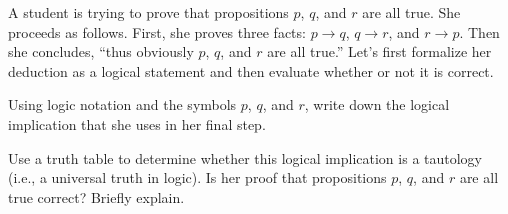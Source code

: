 \documentclass[twoside,12pt]{article}
\begin{document}
\begin{problem}{20} A student is trying to prove that propositions $p$, $q$, and $r$ are
all true.  She proceeds as follows.  First, she proves three facts: $p
\rightarrow q$, $q \rightarrow r$, and $r
\rightarrow p$.  Then she concludes, ``thus obviously $p$, $q$, and
$r$ are all true.''  Let's first formalize her deduction as a logical
statement and then evaluate whether or not it is correct.


\bparts
{} Using logic notation and the symbols $p$, $q$, and $r$,
write down the logical implication that she uses in her final step.


 Use a truth table to determine whether this logical
implication is a tautology (i.e., a universal truth in logic).
 Is her proof that propositions $p$, $q$, and $r$ are all
true correct?  Briefly explain.


\eparts
\end{problem}
\end{document}
